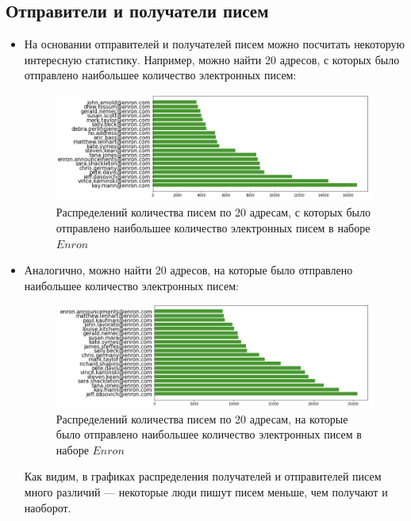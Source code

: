 \subsection{Отправители и получатели писем}

\begin{itemize}


\item На основании отправителей и получателей писем можно посчитать некоторую интересную статистику. Например, можно найти 20 адресов, с которых было отправлено наибольшее количество электронных писем:


\begin{figure}[H]
\centering
\includegraphics[scale=0.5]{pics/enron_most_sent.png}
\caption{Распределений количества писем по 20 адресам, с которых было отправлено наибольшее количество электронных писем в наборе $Enron$}
\end{figure}


\item Аналогично, можно найти 20 адресов, на которые было отправлено наибольшее количество электронных писем:


\begin{figure}[H]
\centering
\includegraphics[scale=0.5]{pics/enron_most_recieved.png}
\caption{Распределений количества писем по 20 адресам, на которые было отправлено наибольшее количество электронных писем в наборе $Enron$}
\end{figure}


Как видим, в графиках распределения получателей и отправителей писем много различий --- некоторые люди пишут писем меньше, чем получают и наоборот.


\end{itemize}
